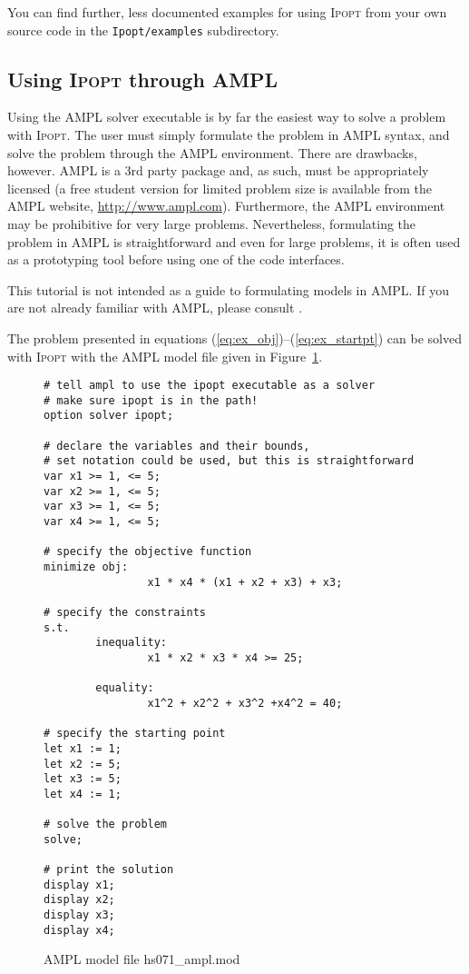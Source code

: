 \documentclass[10pt]{article}
\newcommand{\Ipopt}{\textsc{Ipopt}\xspace}
\begin{document}
You can find further, less documented examples for using \Ipopt from
your own source code in the {\tt Ipopt/examples} subdirectory.

\subsection{Using \Ipopt through AMPL}
Using the AMPL solver executable is by far the easiest way to
solve a problem with \Ipopt. The user must simply formulate the problem
in AMPL syntax, and solve the problem through the AMPL environment.
There are drawbacks, however. AMPL is a 3rd party package and, as
such, must be appropriately licensed (a free student version for
limited problem size is available from the AMPL website,
\url{http://www.ampl.com}). Furthermore, the AMPL environment may be prohibitive
for very large problems. Nevertheless, formulating the problem in AMPL
is straightforward and even for large problems, it is often used as a
prototyping tool before using one of the code interfaces.

This tutorial is not intended as a guide to formulating models in
AMPL. If you are not already familiar with AMPL, please consult
\cite{FouGayKer:AMPLbook}.

The problem presented in equations
(\ref{eq:ex_obj})--(\ref{eq:ex_startpt}) can be solved with \Ipopt with
the AMPL model file given in Figure~\ref{fig:HS71}.

\begin{figure}
  \centering
\begin{footnotesize}
\begin{verbatim}
# tell ampl to use the ipopt executable as a solver
# make sure ipopt is in the path!
option solver ipopt;

# declare the variables and their bounds, 
# set notation could be used, but this is straightforward
var x1 >= 1, <= 5; 
var x2 >= 1, <= 5; 
var x3 >= 1, <= 5; 
var x4 >= 1, <= 5;

# specify the objective function
minimize obj:
                x1 * x4 * (x1 + x2 + x3) + x3;
        
# specify the constraints
s.t.
        inequality:
                x1 * x2 * x3 * x4 >= 25;
                
        equality:
                x1^2 + x2^2 + x3^2 +x4^2 = 40;

# specify the starting point            
let x1 := 1;
let x2 := 5;
let x3 := 5;
let x4 := 1;

# solve the problem
solve;

# print the solution
display x1;
display x2;
display x3;
display x4;
\end{verbatim}
\end{footnotesize}
  
  \caption{AMPL model file hs071\_ampl.mod}
  \label{fig:HS71}
\end{figure}
\end{document}
